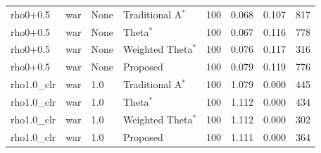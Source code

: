 \begin{table}[htbp]
\begin{tabular}{llllrrrr}
rho0+0.5 & war & None & Traditional A$^{*}$ & 100 & 0.068 & 0.107 & 817 \\
rho0+0.5 & war & None & Theta$^{*}$ & 100 & 0.067 & 0.116 & 778 \\
rho0+0.5 & war & None & Weighted Theta$^{*}$ & 100 & 0.076 & 0.117 & 316 \\
rho0+0.5 & war & None & Proposed & 100 & 0.079 & 0.119 & 776 \\
rho1.0\_clr & war & 1.0 & Traditional A$^{*}$ & 100 & 1.079 & 0.000 & 445 \\
rho1.0\_clr & war & 1.0 & Theta$^{*}$ & 100 & 1.112 & 0.000 & 434 \\
rho1.0\_clr & war & 1.0 & Weighted Theta$^{*}$ & 100 & 1.112 & 0.000 & 302 \\
rho1.0\_clr & war & 1.0 & Proposed & 100 & 1.111 & 0.000 & 364 \\
\bottomrule
\end{tabular}
\end{table}
